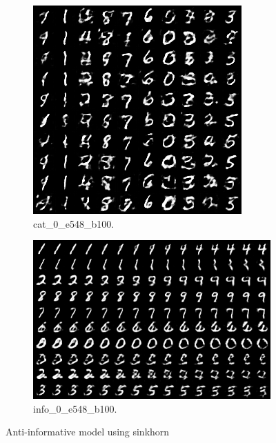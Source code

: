 \begin{figure}[!htbp]
   \centering
\begin{subfigure}[t]{0.48\textwidth}
   \includegraphics[width=\textwidth,center]{2019-04-30/mnist/anti-info/cat_0_e548_b100.png}
   \caption{cat_0_e548_b100.}
   \label{fig:.._.._notes_journal_figures_2019-04-30_mnist_anti-info-a}
\end{subfigure}
\begin{subfigure}[t]{0.48\textwidth}
   \includegraphics[width=\textwidth,center]{2019-04-30/mnist/anti-info/info_0_e548_b100.png}
   \caption{info_0_e548_b100.}
   \label{fig:.._.._notes_journal_figures_2019-04-30_mnist_anti-info-b}
\end{subfigure}
   \caption{Anti-informative model using sinkhorn}
   \label{fig:2019-04-30_mnist_anti-info}
\end{figure}